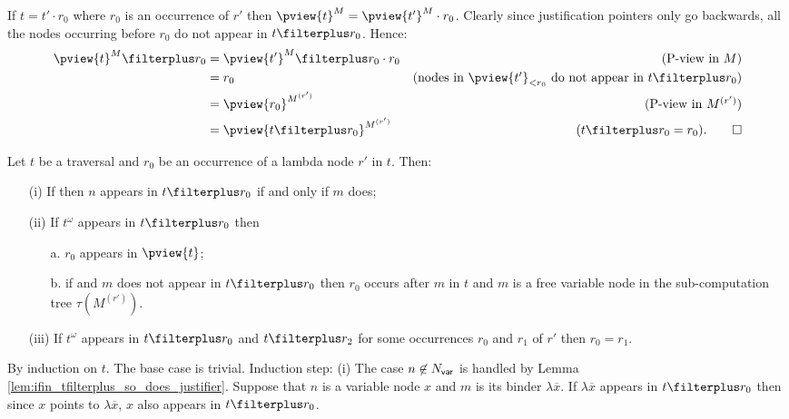 \begin{compactitem}


    \item If $t =  t' \cdot r_0$ where $r_0$ is an occurrence of $r'$ then $\pview{t}^M = \pview{t'}^M \cdot r_0$. Clearly since justification pointers only go backwards, all the nodes occurring before $r_0$ do not appear in $t \filterplus r_0$. Hence:
        \begin{align*}
        \pview{t}^M \filterplus  r_0
            &=  \pview{t'}^M \filterplus  r_0 \cdot r_0 & (\mbox{P-view in $M$})\\
            &=  r_0                                     & (\mbox{nodes in $\pview{t'}_{< r_0}$ do not appear in $t \filterplus  r_0$}) \\
            &=  \pview{r_0 }^{M^{(r')}}                 & (\mbox{P-view in $M^{(r')}$})\\
            &= \pview{t \filterplus  r_0 }^{M^{(r')}} & \mbox{($t \filterplus  r_0 = r_0$)}. \qed
        \end{align*}
    \end{compactitem}



\begin{lemma}
\label{lem:if_binder_beforeafter_r0}
Let $t$ be a traversal and $r_0$ be an occurrence of a lambda node $r'$ in $t$.
Then:
\begin{itemize}
\item[(i)] If  then $n$ appears in $t\filterplus r_0$ if and only if $m$ does;

\item[(ii)] If $t^\omega$ appears in $t\filterplus r_0$ then
    \begin{itemize}
    \item[a.] $r_0$ appears in $\pview{t}$;
    \item[b.] if  and $m$ does not appear in $t\filterplus r_0$ then
    $r_0$ occurs after $m$ in $t$ and $m$ is a free variable node in the sub-computation tree $\tau(M^{(r')})$.
    \end{itemize}
\item[(iii)] If $t^\omega$ appears in $t\filterplus r_0$
and $t\filterplus r_2$ for some occurrences $r_0$ and $r_1$ of $r'$ then $r_0 = r_1$.
\end{itemize}
\end{lemma}
\proof By induction on $t$. The base case is trivial.
Induction step:
(i) The case $n\not\in  N_{\sf var}$ is handled by Lemma \ref{lem:ifin_tfilterplus_so_does_justifier}.
Suppose that $n$ is a variable node $x$ and $m$ is its binder $\lambda \overline{x}$.
If $\lambda \overline{x}$ appears in $t\filterplus r_0$ then since $x$ points to $\lambda \overline{x}$, $x$ also appears in $t\filterplus r_0$.

